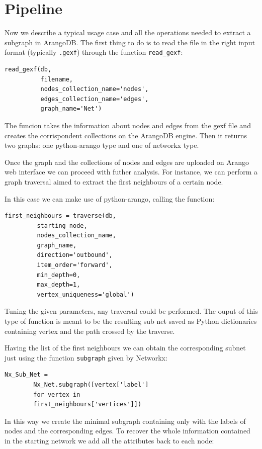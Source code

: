 \documentclass[11pt,twocolumn]{article}
\begin{document}
\section{Pipeline}
Now we describe a typical usage case and all the operations needed to extract a subgraph in ArangoDB.
The first thing to do is to read the file in the right input format (typically \texttt{.gexf}) through the function \texttt{read\_gexf}:

\begin{verbatim}
read_gexf(db,
          filename,
          nodes_collection_name='nodes',
          edges_collection_name='edges',
          graph_name='Net')
\end{verbatim}

The funcion takes the information about nodes and edges from the gexf file and creates the corrispondent  collections on the ArangoDB engine. Then it returns two graphs: one python-arango type and one of networkx type.

Once the graph and the collections of nodes and edges are uploaded on Arango web interface we can proceed with futher analysis. For instance, we can perform a graph traversal aimed to extract the first neighbours of a certain node.

In this case we can make use of python-arango, calling the function:

\begin{verbatim}
first_neighbours = traverse(db,
         starting_node,
         nodes_collection_name,
         graph_name,
         direction='outbound',
         item_order='forward',
         min_depth=0,
         max_depth=1,
         vertex_uniqueness='global')
\end{verbatim}

Tuning the given parameters, any traversal could be performed. The ouput of this type of function is meant to be the resulting sub net saved as Python dictionaries containing vertex and the path crossed by the traverse.

Having the list of the first neighbours we can obtain the corresponding subnet just using the function \texttt{subgraph} given by Networkx:

\begin{verbatim}
Nx_Sub_Net =
        Nx_Net.subgraph([vertex['label']
        for vertex in
        first_neighbours['vertices']])
\end{verbatim}

In this way we create the minimal subgraph containing only with the labels of nodes and the corresponding edges. To recover the whole information contained in the starting network we add all the attributes back to each node:
\end{document}
